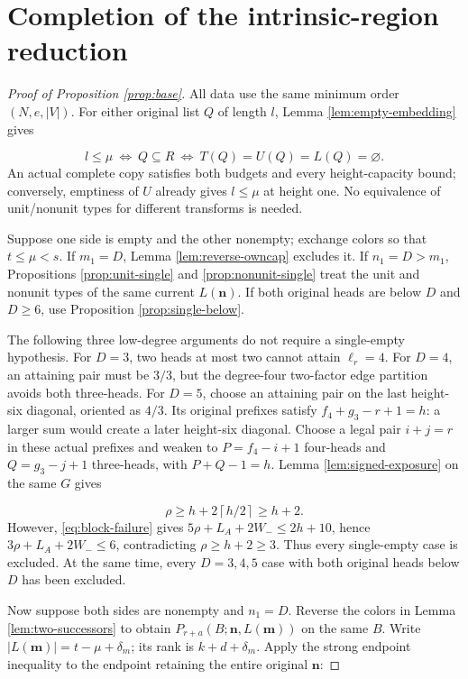 \documentclass[11pt,a4paper]{article}
\newcommand{\nn}{\mathbf n}\newcommand{\mm}{\mathbf m}
\newcommand{\ceil}[1]{\left\lceil#1\right\rceil}
\theoremstyle{definition}
\begin{document}
\section{Completion of the intrinsic-region reduction}\label{app:base-gluing}
\begin{proof}[Proof of Proposition \ref{prop:base}]
All data use the same minimum order $(N,e,|V|)$.
For either original list $Q$ of length $l$, Lemma \ref{lem:empty-embedding} gives

\[
l\le\mu
\ \Longleftrightarrow\ Q\subseteq R
\ \Longleftrightarrow\ T(Q)=U(Q)=L(Q)=\varnothing .
\]
An actual complete copy satisfies both budgets and every height-capacity bound; conversely, emptiness of $U$ already gives $l\le\mu$ at height one.
No equivalence of unit/nonunit types for different transforms is needed.

Suppose one side is empty and the other nonempty; exchange colors so that $t\le\mu<s$.
If $m_1=D$, Lemma \ref{lem:reverse-owncap} excludes it.
If $n_1=D>m_1$, Propositions \ref{prop:unit-single} and \ref{prop:nonunit-single} treat the unit and nonunit types of the same current $L(\nn)$.
If both original heads are below $D$ and $D\ge6$, use Proposition \ref{prop:single-below}.

The following three low-degree arguments do not require a single-empty hypothesis.
For $D=3$, two heads at most two cannot attain $\ell_r=4$.
For $D=4$, an attaining pair must be $3/3$, but the degree-four two-factor edge partition avoids both three-heads.
For $D=5$, choose an attaining pair on the last height-six diagonal, oriented as $4/3$.
Its original prefixes satisfy $f_4+g_3-r+1=h$: a larger sum would create a later height-six diagonal.
Choose a legal pair $i+j=r$ in these actual prefixes and weaken to
$P=f_4-i+1$ four-heads and $Q=g_3-j+1$ three-heads, with $P+Q-1=h$.
Lemma \ref{lem:signed-exposure} on the same $G$ gives

\[
\rho\ge h+2\ceil{h/2}\ge h+2.
\]
However, \eqref{eq:block-failure} gives
$5\rho+L_A+2W_-\le2h+10$, hence
$3\rho+L_A+2W_-\le6$, contradicting $\rho\ge h+2\ge3$.
Thus every single-empty case is excluded.
At the same time, every $D=3,4,5$ case with both original heads below $D$ has been excluded.

Now suppose both sides are nonempty and $n_1=D$.
Reverse the colors in Lemma \ref{lem:two-successors} to obtain
$P_{r+a}(B;\nn,L(\mm))$ on the same $B$.
Write $|L(\mm)|=t-\mu+\delta_m$; its rank is $k+d+\delta_m$.
Apply the strong endpoint inequality to the endpoint retaining the entire original $\nn$:


\end{proof}
\end{document}
